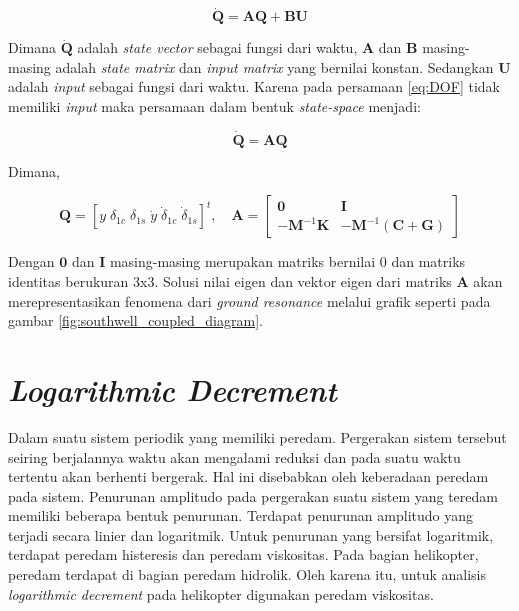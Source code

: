 \begin{equation}
	\label{eq:AdanQ}
	\mathbf{\dot{Q}}=\mathbf{AQ}+\mathbf{BU}
\end{equation}

Dimana $\mathbf{\dot{Q}}$ adalah \textit{state vector} sebagai fungsi dari waktu, $\mathbf{A}$ dan $\mathbf{B}$ masing-masing adalah \textit{state matrix} dan \textit{input matrix} yang bernilai konstan. Sedangkan $\mathbf{U}$ adalah \textit{input} sebagai fungsi dari waktu. Karena pada persamaan \ref{eq:DOF} tidak memiliki \textit{input} maka persamaan dalam bentuk \textit{state-space} menjadi:

\begin{equation}
	\label{eq:state-space_simplified}
	\mathbf{\dot{Q}}=\mathbf{AQ}
\end{equation}

Dimana,

\begin{equation}
	\label{eq:state-space}
	\mathbf{Q}=[y \; \delta_{1c} \; \delta_{1s} \; \dot{y} \; \dot{\delta}_{1c} \; \dot{\delta}_{1s}]^t, \quad
	\mathbf{A}=\begin{bmatrix}
		\mathbf{0}& \mathbf{I}\\
		\mathbf{-M}^{-1}\mathbf{K}& \mathbf{-M}^{-1}(\mathbf{C}+\mathbf{G})
	\end{bmatrix}	
\end{equation}

Dengan $\mathbf{0}$ dan $\mathbf{I}$ masing-masing merupakan matriks bernilai $0$ dan matriks identitas berukuran 3x3. Solusi nilai eigen dan vektor eigen dari matriks $\mathbf{A}$ akan merepresentasikan fenomena dari \textit{ground resonance} melalui grafik seperti pada gambar \ref{fig:southwell_coupled_diagram}. 

\section{\textit{Logarithmic Decrement}}

Dalam suatu sistem periodik yang memiliki peredam. Pergerakan sistem tersebut seiring berjalannya waktu akan mengalami reduksi dan pada suatu waktu tertentu akan berhenti bergerak. Hal ini disebabkan oleh keberadaan peredam pada sistem. Penurunan amplitudo pada pergerakan suatu sistem yang teredam memiliki beberapa bentuk penurunan. Terdapat penurunan amplitudo yang terjadi secara linier dan logaritmik. Untuk penurunan yang bersifat logaritmik, terdapat peredam histeresis dan peredam viskositas. Pada bagian helikopter, peredam terdapat di bagian peredam hidrolik. Oleh karena itu, untuk analisis \textit{logarithmic decrement} pada helikopter digunakan peredam viskositas.

